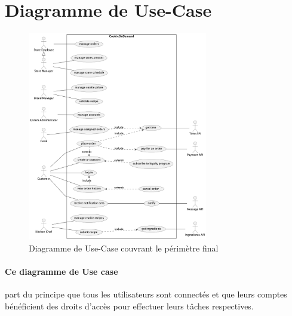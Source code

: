 \section{Diagramme de Use-Case}


\begin{figure}[!ht]
\includegraphics[width=0.7\textwidth]{use-cases}
\centering
\caption{Diagramme de Use-Case couvrant le périmètre final}
\label{uml:use-cases}
\end{figure}

\paragraph{Ce diagramme de Use case} part du principe que tous les utilisateurs sont connectés et que leurs comptes 
bénéficient des droits d’accès pour effectuer leurs tâches respectives.
